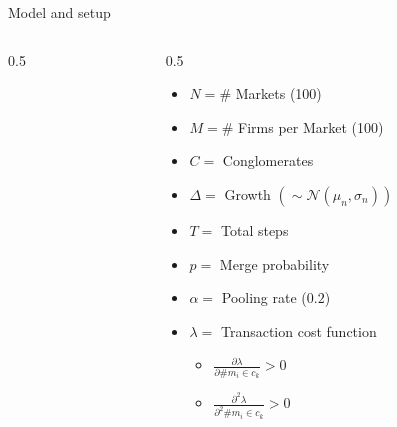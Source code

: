 \documentclass[aspectratio=169]{beamer}
\begin{document}
\begin{frame}{Model and setup}
\begin{columns}[T]
\begin{column}{0.5\textwidth}
\begin{minipage}{\linewidth}
\begin{algorithm}[H]
{          }
        \end{algorithm}
      \end{minipage}
    \end{column}
    \begin{column}{0.5\textwidth}  
      \begin{itemize}
        \item $N = \#$ Markets (100)
        \item $M = \#$ Firms per Market (100)
        \item $C =$ Conglomerates
        \item $\Delta =$ Growth $(\sim \mathcal{N}(\mu_n, \sigma_n))$
        \item $T =$ Total steps
        \item $p =$ Merge probability
        \item $\alpha =$ Pooling rate ($0.2$)
        \item $\lambda =$ Transaction cost function
        \begin{itemize}
          \item $\frac{\partial \lambda}{\partial \# m_i \in c_k} > 0$
          \item $\frac{\partial^2 \lambda }{\partial^2 \# m_i \in c_k} > 0$ 
        \end{itemize}
      \end{itemize}
    \end{column}
  \end{columns}
\end{frame}
\end{document}
